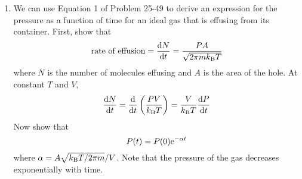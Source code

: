\documentclass[../psets.tex]{subfiles}
\begin{document}
\begin{enumerate}[label={\textbf{27-\arabic*.}},leftmargin=3.5em]
    \item We can use Equation 1 of Problem 25-49 to derive an expression for the pressure as a function of time for an ideal gas that is effusing from its container. First, show that
    \begin{equation*}
        \text{rate of effusion} = \dv{N}{t}
        = \frac{PA}{\sqrt{2\pi m\kB T}}
    \end{equation*}
    where $N$ is the number of molecules effusing and $A$ is the area of the hole. At constant $T$ and $V$,
    \begin{equation*}
        \dv{N}{t} = \dv{t}\left( \frac{PV}{\kB T} \right)
        = \frac{V}{\kB T}\dv{P}{t}
    \end{equation*}
    Now show that
    \begin{equation*}
        P(t) = P(0)\e[-\alpha t]
    \end{equation*}
    where $\alpha=A\sqrt{\kB T/2\pi m}/V$. Note that the pressure of the gas decreases exponentially with time.
\end{enumerate}
\end{document}
